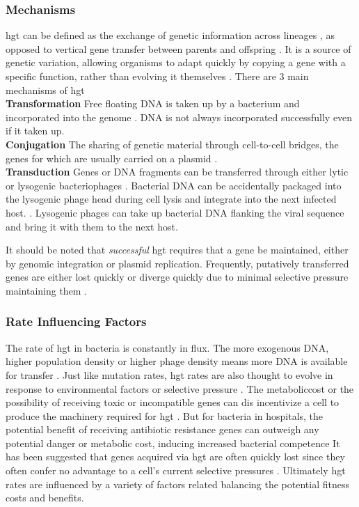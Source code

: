 \subsubsection{Mechanisms}
\ac{hgt} can be defined as the exchange of genetic information across lineages \citep{lgt}, as opposed to vertical gene transfer between parents and offspring \citep{ihgt}.
It is a source of genetic variation, allowing organisms to adapt quickly by copying a gene with a specific function, rather than evolving it themselves \citep{ihgt,adaevo}.
There are 3 main mechanisms of \ac{hgt}\\
\textbf{Transformation}
Free floating DNA is taken up by a bacterium and incorporated into the genome \citep{lgt}. DNA is not always incorporated successfully even if it taken up.\\
\textbf{Conjugation}
The sharing of genetic material through cell-to-cell bridges, the genes for which are usually carried on a plasmid \citep{conjug}.\\
\textbf{Transduction}
Genes or DNA fragments can be transferred through either lytic or lysogenic bacteriophages \citep{transd}.
Bacterial DNA can be accidentally packaged into the lysogenic phage head during cell lysis and integrate into the next infected host.  \citep{transd}.
Lysogenic phages can take up bacterial DNA flanking the viral sequence and bring it with them to the next host\citep{transd}.\par
It should be noted that \textit{successful} \ac{hgt} requires that a gene be maintained, either by genomic integration or plasmid replication.
Frequently, putatively transferred genes are either lost quickly or diverge quickly due to minimal selective pressure maintaining them \citep{fastlane}.
\subsubsection{Rate Influencing Factors}
The rate of \ac{hgt} in bacteria is constantly in flux\citep{trendbs}.
The more exogenous DNA, higher population density or higher phage density means more DNA is available for transfer \citep{lgt}.
Just like mutation rates, \ac{hgt} rates are also thought to evolve in response to environmental factors or selective pressure \citep{mtrate,hgtrate}.
The metaboliccost or the possibility of receiving toxic or incompatible genes can dis incentivize a cell to produce the machinery required for \ac{hgt} \citep{hgtcost}.
But for bacteria in hospitals, the potential benefit of receiving antibiotic resistance genes can outweigh any potential danger or metabolic cost, inducing increased bacterial competence \citep{hospital}
It has been suggested that genes acquired via \ac{hgt} are often quickly lost since they often confer no advantage to a cell's current selective pressures \citep{fastlane}.
Ultimately \ac{hgt} rates are influenced by a variety of factors related balancing the potential fitness costs and benefits.

